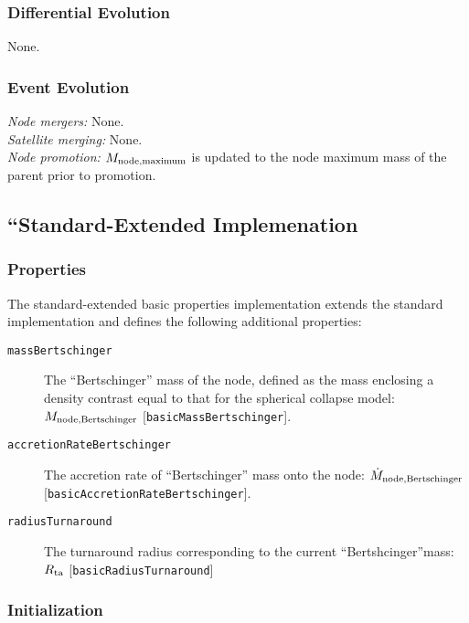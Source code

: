 \subsubsection{Differential Evolution}

None.

\subsubsection{Event Evolution}

\noindent\emph{Node mergers:} None.\\

\noindent\emph{Satellite merging:} None.\\

\noindent\emph{Node promotion:} $M_{\rm node, maximum}$ is updated to the \gls{node} maximum mass of the parent prior to promotion.\\

\subsection{``Standard-Extended Implemenation}

\subsubsection{Properties}

The standard-extended basic properties implementation extends the standard implementation and defines the following additional properties:
\begin{description}
 \item [{\tt massBertschinger}] The ``Bertschinger'' mass of the node, defined as the mass enclosing a density contrast equal to that for the spherical collapse model: $M_{\rm node, Bertschinger}$ [{\tt basicMassBertschinger}].
 \item [{\tt accretionRateBertschinger}] The accretion rate of ``Bertschinger'' mass onto the node: $\dot{M}_{\rm node, Bertschinger}$ [{\tt basicAccretionRateBertschinger}].
 \item [{\tt radiusTurnaround}] The turnaround radius corresponding to the current ``Bertshcinger''mass: $R_{\rm ta}$ [{\tt basicRadiusTurnaround}]
\end{description}

\subsubsection{Initialization}

